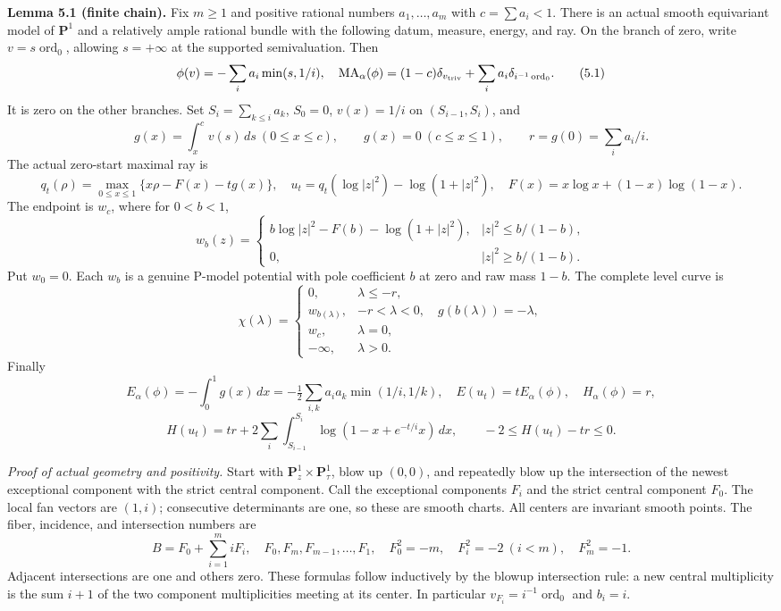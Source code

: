 \documentclass[
  11pt,
]{article}
\begin{document}
\textbf{Lemma 5.1 (finite chain).} Fix \(m\geq1\) and positive rational
numbers \(a_1,\ldots,a_m\) with \(c=\sum a_i<1\). There is an actual
smooth equivariant model of \(\mathbf P^1\) and a relatively ample
rational bundle with the following datum, measure, energy, and ray. On
the branch of zero, write \(v=s\operatorname{ord}_0\), allowing
\(s=+\infty\) at the supported semivaluation. Then \[
 \phi(v)=-\sum_i a_i\min(s,1/i),\quad
 \operatorname{MA}_\alpha(\phi)=(1-c)\delta_{v_{\rm triv}}
                     +\sum_i a_i\delta_{i^{-1}\operatorname{ord}_0}.
 \tag{5.1}
\] It is zero on the other branches. Set \(S_i=\sum_{k\leq i}a_k\),
\(S_0=0\), \(v(x)=1/i\) on \((S_{i-1},S_i)\), and \[
 g(x)=\int_x^c v(s)\,ds\ (0\leq x\leq c),\qquad
 g(x)=0\ (c\leq x\leq1),\qquad r=g(0)=\sum_i a_i/i.
\] The actual zero-start maximal ray is \[
 q_t(\rho)=\max_{0\leq x\leq1}\{x\rho-F(x)-tg(x)\},\quad
 u_t=q_t(\log|z|^2)-\log(1+|z|^2),\quad
 F(x)=x\log x+(1-x)\log(1-x).
 \tag{5.2}
\] The endpoint is \(w_c\), where for \(0<b<1\), \[
 w_b(z)=
 \begin{cases}
 b\log|z|^2-F(b)-\log(1+|z|^2),&|z|^2\leq b/(1-b),\\
 0,&|z|^2\geq b/(1-b).
 \end{cases} \tag{5.3}
\] Put \(w_0=0\). Each \(w_b\) is a genuine P-model potential with pole
coefficient \(b\) at zero and raw mass \(1-b\). The complete level curve
is \[
 \chi(\lambda)=
 \begin{cases}
 0,&\lambda\leq-r,\\
 w_{b(\lambda)},&-r<\lambda<0,\quad g(b(\lambda))=-\lambda,\\
 w_c,&\lambda=0,\\
 -\infty,&\lambda>0.
 \end{cases} \tag{5.4}
\] Finally \[
 E_\alpha(\phi)=-\int_0^1g(x)\,dx
 =-\tfrac12\sum_{i,k}a_ia_k\min(1/i,1/k),\quad
 E(u_t)=tE_\alpha(\phi),\quad H_\alpha(\phi)=r,
 \tag{5.5}
\] \[
 H(u_t)=tr+2\sum_i\int_{S_{i-1}}^{S_i}
        \log(1-x+e^{-t/i}x)\,dx,\qquad -2\leq H(u_t)-tr\leq0.
 \tag{5.6}
\]

\emph{Proof of actual geometry and positivity.} Start with
\(\mathbf P^1_z\times\mathbf P^1_\tau\), blow up \((0,0)\), and
repeatedly blow up the intersection of the newest exceptional component
with the strict central component. Call the exceptional components
\(F_i\) and the strict central component \(F_0\). The local fan vectors
are \((1,i)\); consecutive determinants are one, so these are smooth
charts. All centers are invariant smooth points. The fiber, incidence,
and intersection numbers are \[
 B=F_0+\sum_{i=1}^m iF_i,\quad
 F_0,F_m,F_{m-1},\ldots,F_1,\quad
 F_0^2=-m,\quad F_i^2=-2\ (i<m),\quad F_m^2=-1.
\] Adjacent intersections are one and others zero. These formulas follow
inductively by the blowup intersection rule: a new central multiplicity
is the sum \(i+1\) of the two component multiplicities meeting at its
center. In particular \(v_{F_i}=i^{-1}\operatorname{ord}_0\) and
\(b_i=i\).
\end{document}
